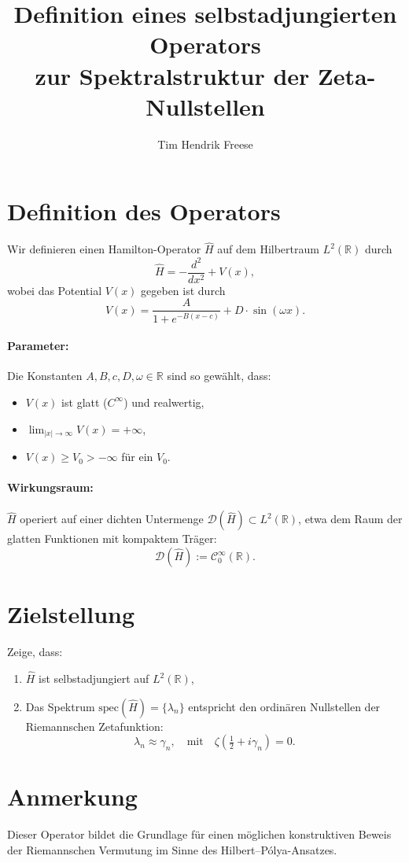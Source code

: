 \documentclass[12pt]{article}
\title{Definition eines selbstadjungierten Operators \\ zur Spektralstruktur der Zeta-Nullstellen}
\author{Tim Hendrik Freese}
\date{}
\begin{document}
\maketitle

\section*{Definition des Operators}

Wir definieren einen Hamilton-Operator \(\hat{H}\) auf dem Hilbertraum \(L^2(\mathbb{R})\) durch
\[
\hat{H} = -\frac{d^2}{dx^2} + V(x),
\]
wobei das Potential \(V(x)\) gegeben ist durch
\[
V(x) = \frac{A}{1 + e^{-B(x - c)}} + D \cdot \sin(\omega x).
\]

\paragraph{Parameter:}
Die Konstanten \(A, B, c, D, \omega \in \mathbb{R}\) sind so gewählt, dass:
\begin{itemize}
    \item \(V(x)\) ist glatt (\(C^\infty\)) und realwertig,
    \item \(\displaystyle \lim_{|x| \to \infty} V(x) = +\infty\),
    \item \(V(x) \geq V_0 > -\infty\) für ein \(V_0\).
\end{itemize}

\paragraph{Wirkungsraum:}
\(\hat{H}\) operiert auf einer dichten Untermenge \(\mathcal{D}(\hat{H}) \subset L^2(\mathbb{R})\), etwa dem Raum der glatten Funktionen mit kompaktem Träger:
\[
\mathcal{D}(\hat{H}) := \mathcal{C}_0^\infty(\mathbb{R}).
\]

\section*{Zielstellung}
Zeige, dass:
\begin{enumerate}
    \item \(\hat{H}\) ist selbstadjungiert auf \(L^2(\mathbb{R})\),
    \item Das Spektrum \(\mathrm{spec}(\hat{H}) = \{ \lambda_n \}\) entspricht den ordinären Nullstellen der Riemannschen Zetafunktion:
    \[
    \lambda_n \approx \gamma_n, \quad \text{mit} \quad \zeta\left( \tfrac{1}{2} + i\gamma_n \right) = 0.
    \]
\end{enumerate}

\section*{Anmerkung}
Dieser Operator bildet die Grundlage für einen möglichen konstruktiven Beweis der Riemannschen Vermutung im Sinne des Hilbert--Pólya-Ansatzes.
\end{document}
